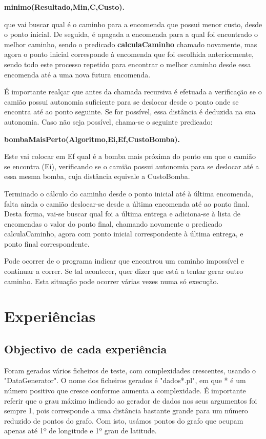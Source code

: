 \documentclass[a4paper]{article}
\begin{document}
\centerline{\textbf{minimo(Resultado,Min,C,Custo).}}

que vai buscar qual é o caminho para a encomenda que possui menor custo, desde o ponto inicial. De seguida, é apagada a encomenda para a qual foi encontrado o melhor caminho, sendo o predicado \textbf{calculaCaminho} chamado novamente, mas agora o ponto inicial corresponde à encomenda que foi escolhida anteriormente, sendo todo este processo repetido para encontrar o melhor caminho desde essa encomenda até a uma nova futura encomenda.

É importante realçar que antes da chamada recursiva é efetuada a verificação se o camião possui autonomia suficiente para se deslocar desde o ponto onde se encontra até ao ponto seguinte. Se for possível, essa distância é deduzida na sua autonomia. Caso não seja possível, chama-se o seguinte predicado:

\centerline{\textbf{bombaMaisPerto(Algoritmo,Ei,Ef,CustoBomba).}}

Este vai colocar em Ef qual é a bomba mais próxima do ponto em que o camião se encontra (Ei), verificando se o camião possui autonomia para se deslocar até a essa mesma bomba, cuja distância equivale a CustoBomba. 

Terminado o cálculo do caminho desde o ponto inicial até à última encomenda, falta ainda o camião deslocar-se desde a última encomenda até ao ponto final. Desta forma, vai-se buscar qual foi a última entrega e adiciona-se à lista de encomendas o valor do ponto final, chamando novamente o predicado calculaCaminho, agora com ponto inicial correspondente à última entrega, e ponto final correspondente.

Pode ocorrer de o programa indicar que encontrou um caminho impossível e continuar a correr. Se tal acontecer, quer dizer que está a tentar gerar outro caminho. Esta situação pode ocorrer várias vezes numa só execução.

\newpage

\section{Experiências}

\subsection{Objectivo de cada experiência}
Foram gerados vários ficheiros de teste, com complexidades crescentes, usando o "DataGenerator". O nome dos ficheiros gerados é "dados*.pl", em que * é um número positivo que cresce conforme aumenta a complexidade. É importante referir que o grau máximo indicado ao gerador de dados nos seus argumentos foi sempre 1, pois corresponde a uma distância bastante grande para um número reduzido de pontos do grafo. Com isto, usámos pontos do grafo que ocupam apenas até 1º de longitude e 1º grau de latitude.
\end{document}

